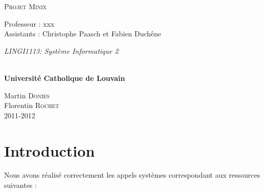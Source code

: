 \documentclass[9pt , a4paper]{report}
\begin{document}
  
  	\begin{titlepage}
		\begin{center}
			{\huge \textsc{Projet Minix}}\\
			\vspace{0.4cm}
			
			{\Large {Professeur : xxx \\ \vspace{0.2cm} Assistants : Christophe Paasch et Fabien Duchêne }}\\
			\vspace{0.6cm}
			
			{\Large \textit{ LINGI1113: Système Informatique 2}}\\
			\vspace{1.2cm}

			\texttt{}\\
			\vspace{0.2cm}
			\vspace{0.1cm}
			{\Large \textbf{Universit\'e Catholique de Louvain}}
			\vspace{0.7cm}

			\vspace{0.2cm}

			Martin \textsc{Donies} \\
			Florentin \textsc{Rochet} \\
			\vspace{0.2cm}
			2011-2012\\
		\end{center}
	\end{titlepage}

	\newpage

	\tableofcontents
	\newpage
	\section{Introduction}
	
	Nous avons réalisé correctement les appels systèmes correspondant aux ressources suivantes : \\
	
\end{document}
